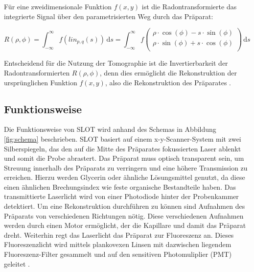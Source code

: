 Für eine zweidimensionale Funktion $f(x,y)$ ist die Radontransformierte das integrierte Signal über den parametrisierten Weg durch das Präparat:

\begin{equation}
R(\rho,\phi) = \int_{- \infty}^{\infty} f(lin_{p,q}(s)) \,\mathrm{d}s
=
\int_{- \infty}^{\infty} f\begin{pmatrix}
\rho \cdot \cos(\phi) - s \cdot \sin(\phi) \\
\rho \cdot \sin(\phi) + s \cdot \cos(\phi) \\
\end{pmatrix} \,\mathrm{d}s
\end{equation}

Entscheidend für die Nutzung der Tomographie ist die Invertierbarkeit der Radontransformierten $R(\rho,\phi)$, denn dies ermöglicht die Rekonstruktion der ursprünglichen Funktion $f(x,y)$, also die Rekonstruktion des Präparates \cite{slot_paper}.

\subsection{Funktionsweise}
Die Funktionsweise von SLOT wird anhand des Schemas in Abbildung \ref{fig:schema} beschrieben.
SLOT basiert auf einem x-y-Scanner-System mit zwei Silberspiegeln, das den auf die Mitte des Präparates fokussierten Laser ablenkt und somit die Probe abrastert.
Das Präparat muss optisch transparent sein, um Streuung innerhalb des Präparats zu verringern und eine höhere Transmission zu erreichen.
Hierzu werden Glycerin oder ähnliche Lösungsmittel genutzt, da diese einen ähnlichen Brechungsindex wie feste organische Bestandteile haben.
Das transmittierte Laserlicht wird von einer Photodiode hinter der Probenkammer detektiert.
Um eine Rekonstruktion durchführen zu können sind Aufnahmen des Präparats von verschiedenen Richtungen nötig.
Diese verschiedenen Aufnahmen werden durch einen Motor ermöglicht, der die Kapillare und damit das Präparat dreht.
Weiterhin regt das Laserlicht das Präparat zur Fluoreszenz an.
Dieses Fluoreszenzlicht wird mittels plankovexen Linsen mit dazwischen liegendem Fluoreszenz-Filter gesammelt und auf den sensitiven Photomuliplier (PMT) geleitet \cite{Anleitung}.\\

